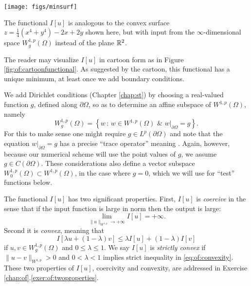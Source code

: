 \begin{marginfigure}
\texttt{[image: figs/minsurf]} %
\medskip
\caption{The functional $I[u]$ is analogous to the convex surface $z = \tfrac{1}{4}(x^4 + y^4) - 2x + 2y$ shown here, but with input from the $\infty$-dimensional space $W_g^{1,p}(\Omega)$ instead of the plane $\mathbb{R}^2$.}
\label{fig:of:cartoonfunctional}
\end{marginfigure}

The reader may visualize $I[u]$ in cartoon form as in Figure \ref{fig:of:cartoonfunctional}.  As suggested by the cartoon, this functional has a unique minimum, at least once we add boundary conditions.

We add Dirichlet conditions (Chapter \ref{chap:st}) by choosing a real-valued function $g$, defined along $\partial \Omega$, so as to determine an affine subspace of $W^{1,p}(\Omega)$, namely
\begin{equation}
    W_g^{1,p}(\Omega) = \left\{w \,:\, w \in W^{1,p}(\Omega) \,\, \& \,\, w\big|_{\partial \Omega} = g\right\}.  \label{eq:of:affinedirichlet}
\end{equation}
For this to make sense one might require $g \in L^p(\partial \Omega)$ and note that the equation $w\big|_{\partial \Omega} = g$ has a precise ``trace operator'' meaning \citep[section 5.5]{Evans2010}.  Again, however, because our numerical scheme will use the point values of $g$, we assume $g\in C(\partial\Omega)$.  These considerations also define a vector subspace $W_0^{1,p}(\Omega) \subset W^{1,p}(\Omega)$, in the case where $g=0$, which we will use for ``test'' functions below.

The functional $I[u]$ has two significant properties.  First, $I[u]$ is \emph{coercive} in the sense that if the input function is large in norm then the output is large:
\begin{equation}
\lim_{\|u\|_{W^{1,p}} \to +\infty} I[u] = +\infty.   \label{eq:of:coercivity}
\end{equation}
Second it is \emph{convex}, meaning that
\begin{equation}
I[\lambda u + (1-\lambda) v] \le \lambda I[u] + (1-\lambda) I[v]    \label{eq:of:convexity}
\end{equation}
if $u,v\in W_g^{1,p}(\Omega)$ and $0 \le \lambda \le 1$.  We say $I[u]$ is \emph{strictly convex} if $\|u-v\|_{W^{1,p}} > 0$ and $0 < \lambda < 1$ implies strict inequality in \eqref{eq:of:convexity}.  These two properties of $I[u]$, coercivity and convexity, are addressed in Exercise \ref{chap:of}.\ref{exer:of:twoproperties}.

